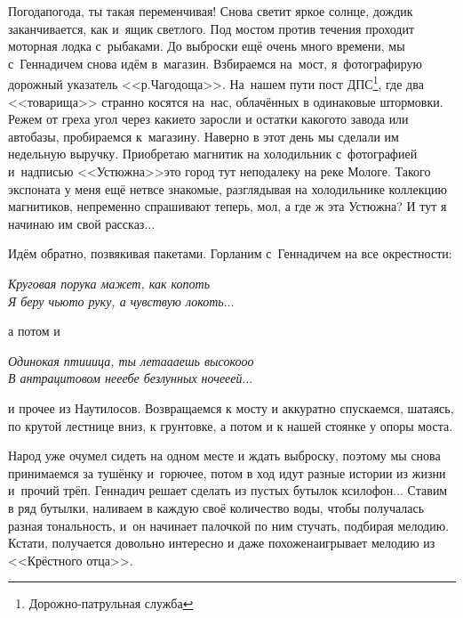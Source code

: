 \renewcommand*{\thefootnote}{\fnsymbol{footnote}}
Погода\sdash погода, ты такая переменчивая! Снова светит яркое солнце, дождик заканчивается, как и~ящик светлого. Под мостом против течения проходит моторная лодка с~рыбаками. До выброски ещё очень много времени, мы с~Геннадичем снова идём в~магазин.  Взбираемся на~мост, я~фотографирую дорожный указатель <<р.\thinspace Чагодоща>>. На~нашем пути пост ДПС\footnote[1]{Дорожно-патрульная служба}, где два <<товарища>> странно косятся на~нас, облачённых в одинаковые штормовки. Режем от греха угол через какие\sdash то заросли и остатки какого\sdash то завода или автобазы, пробираемся к~магазину. Наверно в этот день мы сделали им недельную выручку. Приобретаю магнитик на холодильник с~фотографией и~надписью <<Устюжна>>\mdash это город тут неподалеку на реке Мологе. Такого экспоната у меня ещё нет\mdash все знакомые, разглядывая на холодильнике коллекцию магнитиков, непременно спрашивают теперь, мол, а где ж эта Устюжна? И тут я начинаю им свой рассказ$\ldots$

Идём обратно, позвякивая пакетами. Горланим с~Геннадичем на все окрестности: 

\vspace{0.2cm}

\noindent\textit{%
	\hspace*{1.2cm}Круговая порука мажет, как копоть\mdash \\
	\hspace*{1.2cm}Я беру чью\sdash то руку, а чувствую локоть$\ldots$
}

\vspace{0.2cm}

\noindent а потом и 

\vspace{0.2cm}

\noindent\textit{%
	\hspace*{1.2cm}Одинокая пти\sdash и\sdash ица, ты лета\sdash а\sdash аешь высоко\sdash о\sdash о\\
	\hspace*{1.2cm}В антрацитовом не\sdash е\sdash ебе безлунных ноче\sdash е\sdash ей$\ldots$
}

\vspace{0.2cm}

\noindent и прочее из Наутилосов. Возвращаемся к мосту и аккуратно спускаемся, шатаясь, по крутой лестнице вниз, к грунтовке, а потом и к нашей стоянке у опоры моста. 

Народ уже очумел сидеть на одном месте и ждать выброску, поэтому мы снова принимаемся за тушёнку и~горючее, потом в ход идут разные истории из жизни и~прочий трёп. Геннадич решает сделать из пустых бутылок ксилофон$\ldots$ Ставим в ряд бутылки, наливаем в каждую своё количество воды, чтобы получалась разная тональность, и~он начинает палочкой по ним стучать, подбирая мелодию. Кстати, получается довольно интересно и даже похоже\mdash наигрывает мелодию из <<Крёстного отца>>. 


